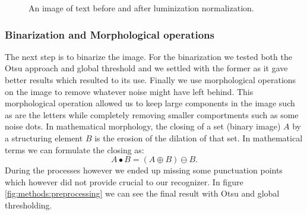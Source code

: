 \begin{figure}
	\centering
	\hfil
	\caption{An image of text \protect{} before and \protect{} after luminization normalization.}
	\label{fig:methods:preprocessing:lumNormalization}
\end{figure}

\subsubsection{Binarization and Morphological operations}

The next step is to binarize the image. For the binarization we tested both the Otsu approach and global threshold and we settled with the former as it gave better results which resulted to its use. Finally we use morphological operations on the image to remove whatever noise might have left behind. This morphological operation allowed us to keep large components in the image such as are the letters while completely removing smaller comportments such as some noise dots. In mathematical morphology, the closing of a set (binary image) $A$ by a structuring element $B$ is the erosion of the dilation of that set. In mathematical terms we can formulate the closing as:
\begin{equation}
A \bullet B = (A \oplus B) \ominus B.
\end{equation}
During the processes however we ended up missing some punctuation points which however did not provide crucial to our recognizer. In figure \ref{fig:methods:preprocessing} we can see the final result with Otsu and global thresholding.

